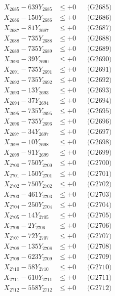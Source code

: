 \documentclass[a4paper,10pt]{article}
\begin{document}
{\begin{align}
X_{2685} - 639Y_{2685} &\leq +0 && \text{(G2685)} \\
X_{2686} - 150Y_{2686} &\leq +0 && \text{(G2686)} \\
X_{2687} - 81Y_{2687} &\leq +0 && \text{(G2687)} \\
X_{2688} - 735Y_{2688} &\leq +0 && \text{(G2688)} \\
X_{2689} - 735Y_{2689} &\leq +0 && \text{(G2689)} \\
X_{2690} - 39Y_{2690} &\leq +0 && \text{(G2690)} \\
\allowbreak
X_{2691} - 735Y_{2691} &\leq +0 && \text{(G2691)} \\
X_{2692} - 735Y_{2692} &\leq +0 && \text{(G2692)} \\
X_{2693} - 13Y_{2693} &\leq +0 && \text{(G2693)} \\
X_{2694} - 37Y_{2694} &\leq +0 && \text{(G2694)} \\
X_{2695} - 735Y_{2695} &\leq +0 && \text{(G2695)} \\
X_{2696} - 735Y_{2696} &\leq +0 && \text{(G2696)} \\
X_{2697} - 34Y_{2697} &\leq +0 && \text{(G2697)} \\
X_{2698} - 10Y_{2698} &\leq +0 && \text{(G2698)} \\
X_{2699} - 91Y_{2699} &\leq +0 && \text{(G2699)} \\
X_{2700} - 750Y_{2700} &\leq +0 && \text{(G2700)} \\
\allowbreak
X_{2701} - 150Y_{2701} &\leq +0 && \text{(G2701)} \\
X_{2702} - 750Y_{2702} &\leq +0 && \text{(G2702)} \\
X_{2703} - 461Y_{2703} &\leq +0 && \text{(G2703)} \\
X_{2704} - 250Y_{2704} &\leq +0 && \text{(G2704)} \\
X_{2705} - 14Y_{2705} &\leq +0 && \text{(G2705)} \\
X_{2706} - 2Y_{2706} &\leq +0 && \text{(G2706)} \\
X_{2707} - 72Y_{2707} &\leq +0 && \text{(G2707)} \\
X_{2708} - 135Y_{2708} &\leq +0 && \text{(G2708)} \\
X_{2709} - 623Y_{2709} &\leq +0 && \text{(G2709)} \\
X_{2710} - 58Y_{2710} &\leq +0 && \text{(G2710)} \\
\allowbreak
X_{2711} - 610Y_{2711} &\leq +0 && \text{(G2711)} \\
X_{2712} - 558Y_{2712} &\leq +0 && \text{(G2712)} \\

\end{align}}
\end{document}
